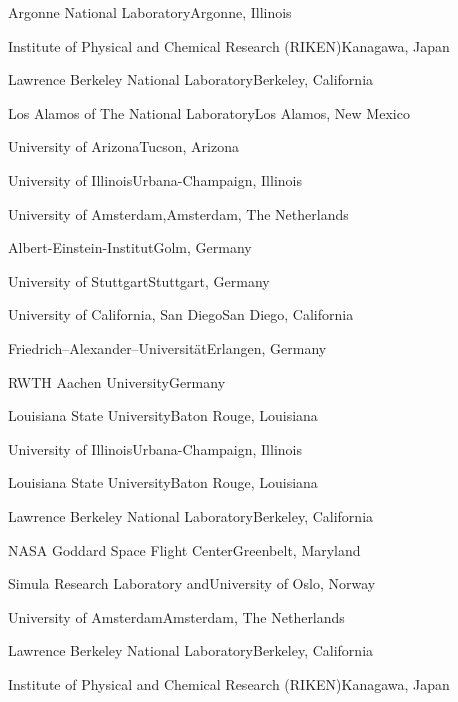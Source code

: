 \begin{multicols}{2}
 {Argonne National Laboratory}{Argonne,
Illinois}

 {Institute of Physical and Chemical Research
(RIKEN)}{Kanagawa, Japan}

 {Lawrence Berkeley National
Laboratory}{Berkeley, California}

 {Los Alamos of The National Laboratory}{Los Alamos,
New Mexico}

{University of Arizona}{Tucson, Arizona}

 {University of
Illinois}{Urbana-Champaign, Illinois}

 {University of
Amsterdam,}{Amsterdam, The Netherlands}

{Albert-Einstein-Institut}{Golm, Germany}

 {University of Stuttgart}{Stuttgart,
Germany}

 {University of California, San Diego}{San
Diego, California}

{Friedrich--Alexander--Universit{\"a}t}{Erlangen, Germany}

{RWTH Aachen University}{Germany}

{Louisiana State University}{Baton Rouge, Louisiana}

 {University of Illinois}{Urbana-Champaign,
Illinois}

{Louisiana State University}{Baton Rouge, Louisiana}

 {Lawrence Berkeley National
Laboratory}{Berkeley, California}

 {NASA Goddard Space Flight Center}{Greenbelt,
Maryland}

{Simula Research Laboratory and}{University of Oslo, Norway}

 {University of Amsterdam}{Amsterdam, The
Netherlands}

 {Lawrence Berkeley National
Laboratory}{Berkeley, California}

 {Institute of Physical and Chemical Research
(RIKEN)}{Kanagawa, Japan}


\end{multicols}
